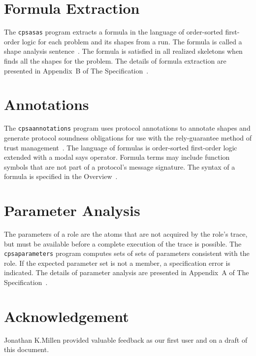 \documentclass[12pt]{article}
\begin{document}
\section{Formula Extraction}\label{sec:formulas}

The \texttt{cpsasas} program extracts a formula in the language of
order-sorted first-order logic for each problem and its shapes from a
{\cpsa} run. The formula is called a shape analysis
sentence~\cite{Ramsdell12}. The formula is satisfied in all realized
skeletons when {\cpsa} finds all the shapes for the problem.  The
details of formula extraction are presented in Appendix~B of The
{\cpsa} Specification~\cite{cpsaspec09}.

\section{Annotations}\label{sec:annotations}

The \texttt{cpsaannotations} program uses protocol annotations to
annotate shapes and generate protocol soundness obligations for use
with the rely-guarantee method of trust
management~\cite{GuttmanEtAl04,RamsdellEtAl09}.  The language of
formulas is order-sorted first-order logic extended with a modal says
operator.  Formula terms may include function symbols that are not
part of a protocol's message signature.  The syntax of a formula is
specified in the {\cpsa} Overview~\cite{cpsaoverview09}.

\section{Parameter Analysis}\label{sec:parameters}

The parameters of a role are the atoms that are not acquired by the
role's trace, but must be available before a complete execution of the
trace is possible. The \texttt{cpsaparameters} program computes sets
of sets of parameters consistent with the role. If the expected
parameter set is not a member, a specification error is indicated.
The details of parameter analysis are presented in Appendix~A of The
{\cpsa} Specification~\cite{cpsaspec09}.

\section*{Acknowledgement}

Jonathan K.\@ Millen provided valuable feedback as our first {\cpsa}
user and on a draft of this document.
\end{document}
